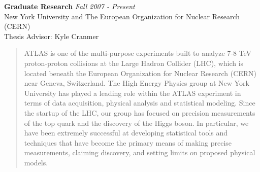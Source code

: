\documentclass[9pt]{article}
\newenvironment{changemargin}[2]{%
  \begin{list}{}{%
    \setlength{\topsep}{0pt}%
    \setlength{\leftmargin}{#1}%
    \setlength{\rightmargin}{#2}%
    \setlength{\listparindent}{\parindent}%
    \setlength{\itemindent}{\parindent}%
    \setlength{\parsep}{\parskip}%
  }%
  \item[]}{\end{list}
}
\newenvironment{body} {
	\vspace*{-16pt}
	\begin{changemargin}{-0.25in}{-0.5in}
  }	
	{\end{changemargin}
}
\begin{document}
\begin{body}
	\vspace{14pt}
	\textbf{Graduate Research} \hfill \emph{Fall 2007 - Present}\\
	New York University and The European Organization for Nuclear Research (CERN) \\
        Thesis Advisor: Kyle Cranmer \\

	\vspace*{-4pt}


        \begin{quotation}
          \justifying

          ATLAS is one of the multi-purpose experiments built to analyze 7-8 TeV proton-proton collisions at the Large Hadron Collider (LHC), 
          which is located beneath the European Organization for Nuclear Research (CERN) near Geneva, Switzerland. 
          The High Energy Physics group at New York University has played a leading role within the ATLAS experiment in terms of data acquisition, physical analysis and statistical modeling. 
          Since the startup of the LHC, our group has focused on precision measurements of the top quark and the discovery of the Higgs boson.
          In particular, we have been extremely successful at developing statistical tools and techniques that have become the primary means of making precise measurements, 
          claiming discovery, and setting limits on proposed physical models.

          \smallskip


\end{quotation}
\end{body}
\end{document}

